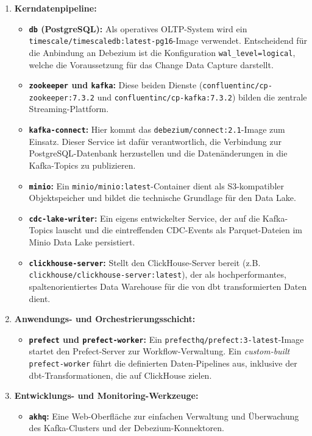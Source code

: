 \documentclass[
    12pt,               
    a4paper,        
    ngerman            
]{scrartcl}
\begin{document}
\begin{enumerate}
    \item \textbf{Kerndatenpipeline:}
    \begin{itemize}
        \item \textbf{\texttt{db} (PostgreSQL):} Als operatives OLTP-System wird ein \texttt{timescale/timescaledb:latest-pg16}-Image verwendet. Entscheidend für die Anbindung an Debezium ist die Konfiguration \texttt{wal\_level=logical}, welche die Voraussetzung für das Change Data Capture darstellt.
        \item \textbf{\texttt{zookeeper} und \texttt{kafka}:} Diese beiden Dienste (\texttt{confluentinc/cp-zookeeper:7.3.2} und \texttt{confluentinc/cp-kafka:7.3.2}) bilden die zentrale Streaming-Plattform.
        \item \textbf{\texttt{kafka-connect}:} Hier kommt das \texttt{debezium/connect:2.1}-Image zum Einsatz. Dieser Service ist dafür verantwortlich, die Verbindung zur PostgreSQL-Datenbank herzustellen und die Datenänderungen in die Kafka-Topics zu publizieren.
        \item \textbf{\texttt{minio}:} Ein \texttt{minio/minio:latest}-Container dient als S3-kompatibler Objektspeicher und bildet die technische Grundlage für den Data Lake.
        \item \textbf{\texttt{cdc-lake-writer}:} Ein eigens entwickelter Service, der auf die Kafka-Topics lauscht und die eintreffenden CDC-Events als Parquet-Dateien im Minio Data Lake persistiert.
        \item \textbf{\texttt{clickhouse-server}:} Stellt den ClickHouse-Server bereit (z.B. \texttt{clickhouse/clickhouse-server:latest}), der als hochperformantes, spaltenorientiertes Data Warehouse für die von dbt transformierten Daten dient.
    \end{itemize}
    
    \item \textbf{Anwendungs- und Orchestrierungsschicht:}
    \begin{itemize}
        \item \textbf{\texttt{prefect} und \texttt{prefect-worker}:} Ein \texttt{prefecthq/prefect:3-latest}-Image startet den Prefect-Server zur Workflow-Verwaltung. Ein \textit{custom-built} \texttt{prefect-worker} führt die definierten Daten-Pipelines aus, inklusive der dbt-Transformationen, die auf ClickHouse zielen.
    \end{itemize}
    
    \item \textbf{Entwicklungs- und Monitoring-Werkzeuge:}
    \begin{itemize}
        \item \textbf{\texttt{akhq}:} Eine Web-Oberfläche zur einfachen Verwaltung und Überwachung des Kafka-Clusters und der Debezium-Konnektoren.
    \end{itemize}
\end{enumerate}
\end{document}
